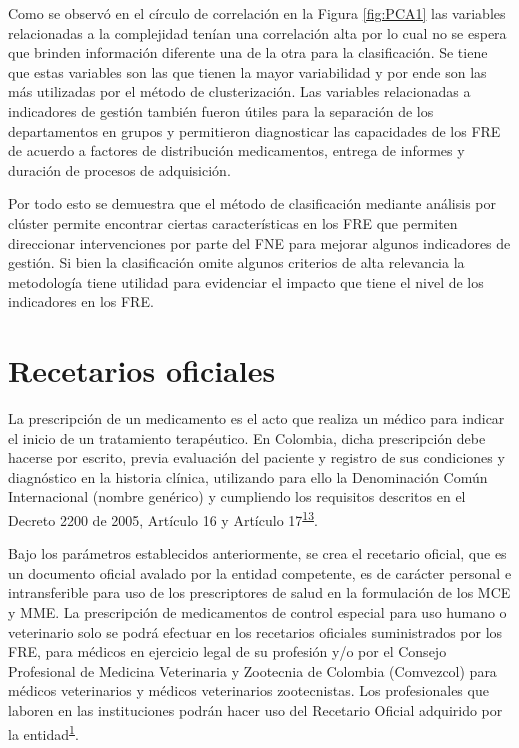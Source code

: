 \documentclass[
  oneside]{book}
\begin{document}
Como se observó en el círculo de correlación en la Figura \ref{fig:PCA1} las variables relacionadas a la complejidad tenían una correlación alta por lo cual no se espera que brinden información diferente una de la otra para la clasificación. Se tiene que estas variables son las que tienen la mayor variabilidad y por ende son las más utilizadas por el método de clusterización. Las variables relacionadas a indicadores de gestión también fueron útiles para la separación de los departamentos en grupos y permitieron diagnosticar las capacidades de los FRE de acuerdo a factores de distribución medicamentos, entrega de informes y duración de procesos de adquisición.

Por todo esto se demuestra que el método de clasificación mediante análisis por clúster permite encontrar ciertas características en los FRE que permiten direccionar intervenciones por parte del FNE para mejorar algunos indicadores de gestión. Si bien la clasificación omite algunos criterios de alta relevancia la metodología tiene utilidad para evidenciar el impacto que tiene el nivel de los indicadores en los FRE.

\hypertarget{recetarios-oficiales}{%
\chapter{Recetarios oficiales}\label{recetarios-oficiales}}


La prescripción de un medicamento es el acto que realiza un médico para indicar el inicio de un tratamiento terapéutico. En Colombia, dicha prescripción debe hacerse por escrito, previa evaluación del paciente y registro de sus condiciones y diagnóstico en la historia clínica, utilizando para ello la Denominación Común Internacional (nombre genérico) y cumpliendo los requisitos descritos en el Decreto 2200 de 2005, Artículo 16 y Artículo 17\textsuperscript{\protect\hyperlink{ref-MSPS2200-2005}{13}}.

Bajo los parámetros establecidos anteriormente, se crea el recetario oficial, que es un documento oficial avalado por la entidad competente, es de carácter personal e intransferible para uso de los prescriptores de salud en la formulación de los MCE y MME. La prescripción de medicamentos de control especial para uso humano o veterinario solo se podrá efectuar en los recetarios oficiales suministrados por los FRE, para médicos en ejercicio legal de su profesión y/o por el Consejo Profesional de Medicina Veterinaria y Zootecnia de Colombia (Comvezcol) para médicos veterinarios y médicos veterinarios zootecnistas. Los profesionales que laboren en las instituciones podrán hacer uso del Recetario Oficial adquirido por la entidad\textsuperscript{\protect\hyperlink{ref-MSPS1478-2006}{1}}.
\end{document}
